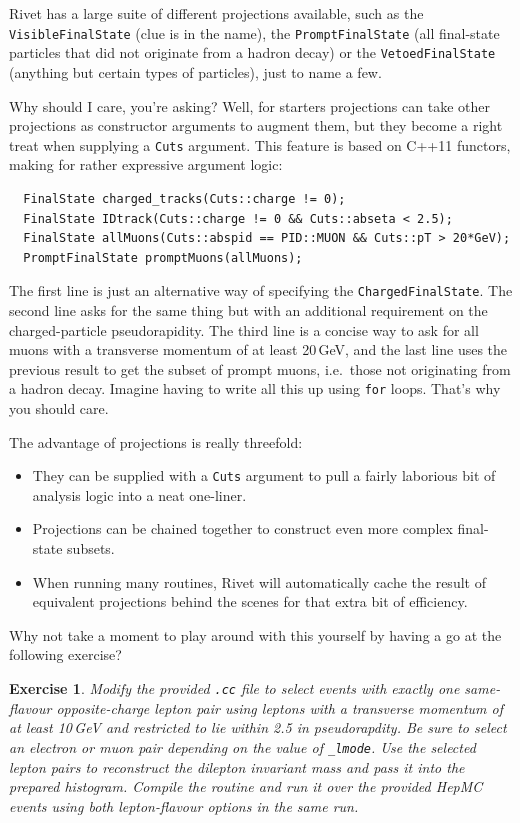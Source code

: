 \documentclass[10pt,fleqn]{scrartcl}
\theoremstyle{exstyle}
\newtheorem{exercise}{Exercise}
\begin{document}
Rivet has a large suite of different projections available,
such as the \verb|VisibleFinalState| (clue is in the name),
the \verb|PromptFinalState| (all final-state particles that
did not originate from a hadron decay)
or the \verb|VetoedFinalState| (anything but certain types of
particles), just to name a few.

Why should I care, you're asking?
Well, for starters projections can take other projections
as constructor arguments to augment them,
but they become a right treat when supplying
a \verb|Cuts| argument. This feature is based on C++11 functors,
making for rather expressive argument logic:
\begin{verbatim}
  FinalState charged_tracks(Cuts::charge != 0);
  FinalState IDtrack(Cuts::charge != 0 && Cuts::abseta < 2.5);
  FinalState allMuons(Cuts::abspid == PID::MUON && Cuts::pT > 20*GeV);
  PromptFinalState promptMuons(allMuons);
\end{verbatim}
The first line is just an alternative way of specifying the
\verb|ChargedFinalState|.
The second line asks for the same thing but with an additional
requirement on the charged-particle pseudorapidity.
The third line is a concise way to ask for all muons with a
transverse momentum of at least 20\,GeV, and the last line
uses the previous result to get the subset of prompt muons,
i.e.\ those not originating from a hadron decay.
Imagine having to write all this up using \verb|for| loops.
That's why you should care.

The advantage of projections is really threefold:
\begin{itemize}
\item They can be supplied with a \verb|Cuts| argument to pull a fairly laborious bit of analysis logic
      into a neat one-liner.
\item Projections can be chained together to construct even more complex final-state subsets.
\item When running many routines, Rivet will automatically cache the result of equivalent
      projections behind the scenes for that extra bit of efficiency.
\end{itemize}
Why not take a moment to play around with this yourself by having a go
at the following exercise?

\begin{exercise}
Modify the provided \verb|.cc| file to select events with exactly one same-flavour
opposite-charge lepton pair using leptons with a transverse momentum of at least 10\,GeV
and restricted to lie within 2.5 in pseudorapdity.
Be sure to select an electron or muon pair depending on the value of \verb|_lmode|.
Use the selected lepton pairs to reconstruct the dilepton invariant mass and
pass it into the prepared histogram. Compile the routine and run it over
the provided HepMC events using both lepton-flavour options in the same run.
\end{exercise}
\end{document}
